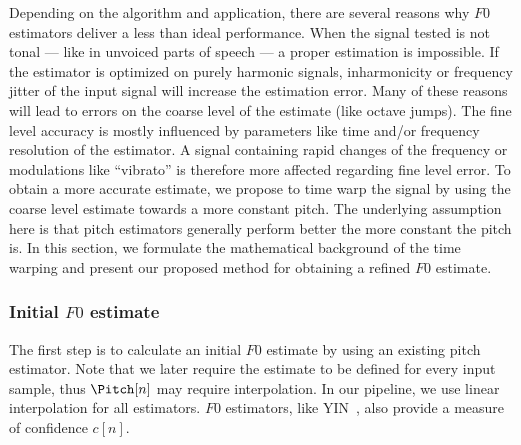 Depending on the algorithm and application, there are several reasons why $F0$ estimators deliver a less than ideal performance. When the signal tested is not tonal --- like in unvoiced parts of speech --- a proper estimation is impossible. If the estimator is optimized on purely harmonic signals, inharmonicity or frequency jitter of the input signal will increase the estimation error. Many of these reasons will lead to errors on the coarse level of the estimate (like octave jumps). The fine level accuracy is mostly influenced by parameters like time and/or frequency resolution of the estimator. A signal containing rapid changes of the frequency or modulations like ``vibrato'' is therefore more affected regarding fine level error. To obtain a more accurate estimate, we propose to time warp the signal by using the coarse level estimate towards a more constant pitch. The underlying assumption here is that pitch estimators generally perform better the more constant the pitch is.
In this section, we formulate the mathematical background of the time warping and present our proposed method for obtaining a refined $F0$ estimate.

\subsubsection{Initial $F0$ estimate}
\label{ssub:initial_estimate}

The first step is to calculate an initial $F0$ estimate by using an existing pitch estimator. Note that we later require the estimate to be defined for every input sample, thus $\Pitch[n]$ may require interpolation. In our pipeline, we use linear interpolation for all estimators. $F0$ estimators, like YIN~\cite{de2002yin}, also provide a measure of confidence $c[n]$.
\par
%
%

